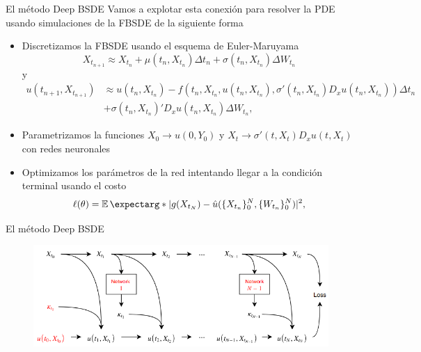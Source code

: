 \documentclass[aspectratio=169,xcolor=dvipsnames]{beamer}
\begin{document}
\begin{frame}{El método Deep BSDE }
Vamos a explotar esta conexión para resolver la PDE usando simulaciones de la FBSDE de la siguiente forma \parencite{han_solving_2018}
\begin{itemize}

	\item Discretizamos la FBSDE usando el esquema de Euler-Maruyama
	\begin{equation}
		\label{eqn:EMForward}
		X_{t_{n+1}} \approx X_{t_n} +\mu\left(t_n, X_{t_n}\right) \Delta t_n+\sigma\left(t_n, X_{t_n}\right) \Delta W_{t_n}
	\end{equation}
y
\begin{equation}
	\label{eqn:EMBackward}
	\begin{aligned}
		u\left(t_{n+1}, X_{t_{n+1}}\right)
		&\approx  u\left(t_n, X_{t_n}\right) -f\left(t_n, X_{t_n}, u\left(t_n, X_{t_n}\right), \sigma'\left(t_n, X_{t_n}\right) D_x u\left(t_n, X_{t_n}\right)\right) \Delta t_n \\
		& +\sigma\left(t_n, X_{t_n}\right)'D_x u\left(t_n, X_{t_n}\right)  \Delta W_{t_n},
	\end{aligned}
\end{equation}
	\item Parametrizamos la funciones $X_0 \to u(0,Y_0)$ y $X_t\to \sigma'(t,X_t)D_x u(t,X_t)$ con redes neuronales 
\item Optimizamos los parámetros de la red intentando llegar a la condición terminal usando el costo
\begin{equation}
	\label{eqn:lossDeepBSDE}
	\ell(\theta)=\expect*{|g(X_{t_N})-\hat{u}(\{X_{t_n}\}_{0}^N,\{W_{t_n}\}_{0}^N)|^2},
\end{equation}

\end{itemize}
\end{frame}

\begin{frame}{El método Deep BSDE}
	\begin{figure}
		\centering
		\includegraphics[width=\linewidth]{images/DeepBSDEMap}
		\label{fig:deepbsdemap}
	\end{figure}
\end{frame}
\end{document}
